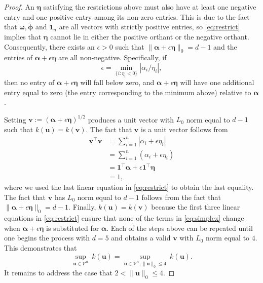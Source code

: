 \documentclass[12pt]{article}
\newcommand{\bl}[1]{{\mathbf #1}}
\newcommand{\bs}[1]{\boldsymbol #1}
\begin{document}
\begin{proof}
An $\bs{\eta}$ satisfying the restrictions above must also have at least one negative entry and one positive entry among its non-zero entries. This is due to the fact that $\bs{\omega}, \tilde{\bs{\phi}}$ and $\bl{1}_n$ are all vectors with strictly positive entries, so \eqref{eq:restrict} implies that $\bs{\eta}$ cannot lie in either the positive orthant or the negative orthant. Consequently, there exists an $\epsilon > 0$ such that $\| \bs{\alpha} + \epsilon \bs{\eta} \|_0 = d-1$ and the entries of $\bs{\alpha} + \epsilon \bs{\eta}$ are all non-negative. Specifically, if
\begin{equation*}
	\epsilon = \min_{\{i : \eta_i < 0\}} |\alpha_i / \eta_i|,
\end{equation*}
then no entry of $\bs{\alpha} + \epsilon \bs{\eta}$ will fall below zero, and $\bs{\alpha} + \epsilon \bs{\eta}$ will have one additional entry equal to zero (the entry corresponding to the minimum above) relative to $\bs{\alpha}$. 

Setting $\bl{v} := (\bs{\alpha} + \epsilon \bs{\eta})^{1/2}$ produces a unit vector with $L_0$ norm equal to $d-1$ such that $k(\bl{u}) = k(\bl{v})$. The fact that $\bl{v}$ is a unit vector follows from
\begin{equation*}
\begin{aligned}
    \bl{v}^\top \bl{v} &= \sum_{i=1}^n |\alpha_i + \epsilon \eta_i| \\
                       &= \sum_{i=1}^n (\alpha_i + \epsilon \eta_i) \\
                       &= \bl{1}^\top \bs{\alpha} + \epsilon \bl{1}^\top \bs{\eta} \\
                       &= 1,
\end{aligned}
\end{equation*}
where we used the last linear equation in \eqref{eq:restrict} to obtain the last equality. The fact that $\bl{v}$ has $L_0$ norm equal to $d-1$ follows from the fact that $\|\bs{\alpha} + \epsilon \bs{\eta}\|_0 = d-1$. Finally, $k(\bl{u}) = k(\bl{v})$ because the first three linear equations in \eqref{eq:restrict} ensure that none of the terms in \eqref{eq:simplex} change when $\bs{\alpha} + \epsilon \bs{\eta}$ is substituted for $\bs{\alpha}$. Each of the steps above can be repeated until one begins the process with $d = 5$ and obtains a valid $\bl{v}$ with $L_0$ norm equal to $4$. This demonstrates that
\begin{equation*}
    \sup_{\bl{u} \in \mathcal{V}^n}~k(\bl{u}) = \sup_{\bl{u} \in \mathcal{V}^n, \|\bl{u}\|_0 \leq 4}~k(\bl{u}).
\end{equation*}
It remains to address the case that $2 < \|\bl{u}\|_0 \leq 4$.
    

\end{proof}
\end{document}
